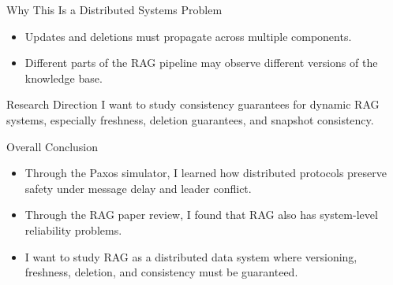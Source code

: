 \documentclass[aspectratio=169]{beamer}
\begin{document}
\begin{frame}{Why This Is a Distributed Systems Problem}
  \begin{itemize}
    \item Updates and deletions must propagate across multiple components.
    \item Different parts of the RAG pipeline may observe different versions of the knowledge base.
  \end{itemize}

  \begin{block}{Research Direction}
    I want to study consistency guarantees for dynamic RAG systems, especially freshness, deletion guarantees, and snapshot consistency.
  \end{block}
\end{frame}

\begin{frame}{Overall Conclusion}
  \begin{itemize}
    \item Through the Paxos simulator, I learned how distributed protocols preserve safety under message delay and leader conflict.
    \item Through the RAG paper review, I found that RAG also has system-level reliability problems.
    \item I want to study RAG as a distributed data system where versioning, freshness, deletion, and consistency must be guaranteed.
  \end{itemize}
\end{frame}
\end{document}
